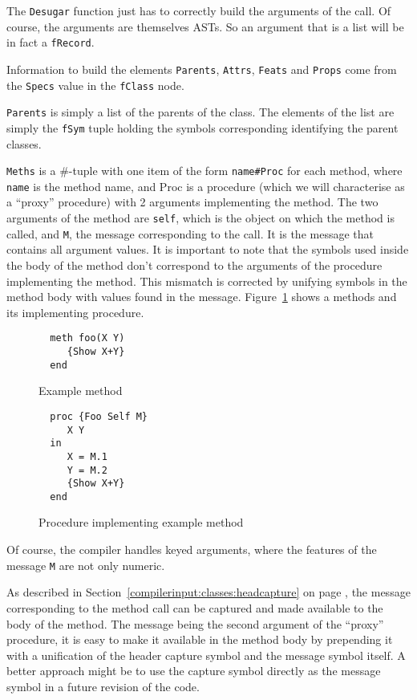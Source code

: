 \documentclass[a4paper]{memoir}
\begin{document}
The \lstinline!Desugar! function just has to correctly build the arguments of
the call. Of course, the arguments are themselves ASTs. So an argument that is a
list will be in fact a \lstinline!fRecord!.

Information to build the elements \lstinline!Parents!, \lstinline!Attrs!,
\lstinline!Feats! and \lstinline!Props! come from the \lstinline!Specs! value in
the \lstinline!fClass! node.

\lstinline!Parents! is simply a list of the parents of the class. The elements
of the list are simply the \lstinline!fSym! tuple holding the symbols
corresponding identifying the parent classes.


\lstinline!Meths! is a \#-tuple with one item of the form \lstinline!name#Proc! for each
method, where \lstinline!name! is the method name, and Proc is a procedure
(which we will characterise as a ``proxy'' procedure) with
2 arguments implementing the method. The two arguments of the method are
\lstinline!self!,
which is the object on which the method is called, and \lstinline!M!, the message
corresponding to the call. It is the message that contains all argument values.
It is important to note that the symbols used inside the body of the method
don't correspond to the arguments of the procedure implementing the method.
This mismatch is corrected by unifying symbols in the method body with values
found in the message. Figure~\ref{fig:methimpl} shows a methods and its implementing procedure.
\begin{figure}[h]
\begin{lstlisting}
  meth foo(X Y)
     {Show X+Y}
  end 
\end{lstlisting}
\caption{Example method}
\begin{lstlisting}
  proc {Foo Self M}
     X Y
  in
     X = M.1
     Y = M.2
     {Show X+Y}
  end  
\end{lstlisting}
\caption{Procedure implementing example method}
\label{fig:methimpl}
\end{figure}

Of course, the compiler handles keyed arguments, where the features of the
message \lstinline!M! are not only numeric.

As described in Section~\ref{compilerinput:classes:headcapture} on page \pageref{compilerinput:classes:headcapture}, the message
corresponding to the method call can be captured and made available to the body of the
method. The message being the second argument of the ``proxy'' procedure, it is
easy to make it available in the method body by prepending it with a unification
of the header capture symbol and the message symbol itself. A better approach
might be to use the capture symbol directly as the message symbol in a future
revision of the code.
\end{document}
